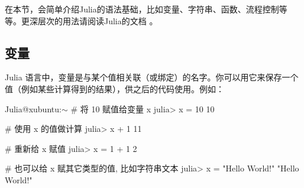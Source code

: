 在本节，会简单介绍Julia的语法基础，比如变量、字符串、函数、流程控制等等。更深层次的用法请阅读Julia的文档 。

\subsection{变量}\label{sec1-3-1}

Julia 语言中，变量是与某个值相关联（或绑定）的名字。你可以用它来保存一个值（例如某些计算得到的结果），供之后的代码使用。例如：

\begin{GitExampla}{Julia@xubuntu:$\sim$}
    # 将 10 赋值给变量 x
    julia> x = 10
    10

    # 使用 x 的值做计算
    julia> x + 1
    11

    # 重新给 x 赋值
    julia> x = 1 + 1
    2

    # 也可以给 x 赋其它类型的值, 比如字符串文本
    julia> x = "Hello World!"
    "Hello World!"
\end{GitExampla}
